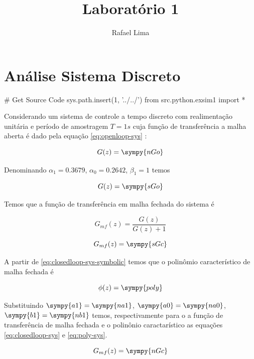 \documentclass[a4paper,11pt]{article}
\title{Laboratório 1} %
\author{Rafael Lima}
\begin{document}

\section{Análise Sistema Discreto}

\begin{sympycode}
# Get Source Code
sys.path.insert(1, '../../')
from src.python.exsim1 import *
\end{sympycode}

Considerando um sistema de controle a tempo discreto com realimentação unitária e período de amostragem $T = 1s$ cuja função de transferência a malha aberta é dado pela equação \ref{eq:openloop-sys} :

\begin{equation}\label{eq:openloop-sys}
    G(z) = \sympy{nGo}
\end{equation}

Denominando $\alpha_1 = 0.3679$, $\alpha_0 = 0.2642$, $\beta_1 = 1$ temos

\begin{equation}\label{eq:openloop-sys-symbolic}
    G(z) = \sympy{sGo}
\end{equation}

Temos que a função de transferência em malha fechada do sistema é

$$G_{mf}(z) = \frac{G(z)}{G(z) + 1}$$

\begin{equation}\label{eq:closedloop-sys-symbolic}
    G_{mf}(z) = \sympy{sGc}
\end{equation}

A partir de \ref{eq:closedloop-sys-symbolic} temos que o polinômio característico de malha fechada é

\begin{equation}\label{eq:poly-sys-symbolic}
    \phi(z) = \sympy{poly}
\end{equation}

Substituindo $\sympy{a1} = \sympy{na1}$, $\sympy{a0} = \sympy{na0}$, $\sympy{b1} = \sympy{nb1}$ temos, respectivamente para o a função de transferência de malha fechada e o polinônio caractarístico as equações \ref{eq:closedloop-sys} e \ref{eq:poly-sys}.

\begin{equation}\label{eq:closedloop-sys}
    G_{mf}(z) = \sympy{nGc}
\end{equation}
\end{document}
